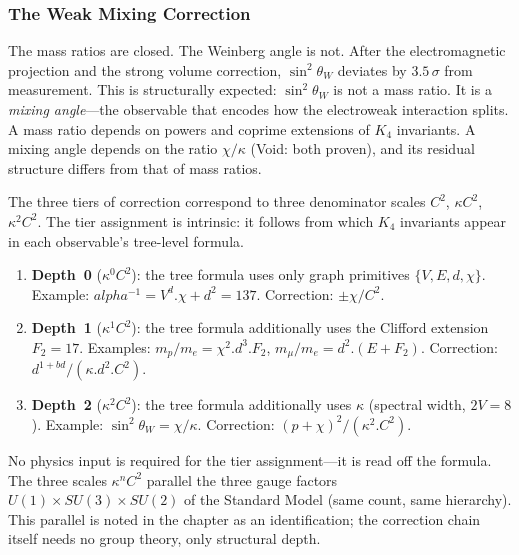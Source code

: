\documentclass[11pt,a4paper]{book}
\def\alpha{alpha}%
\def\cdot{.}%
\def\mathrm#1{#1}%
\begin{document}
\subsubsection*{The Weak Mixing Correction}

The mass ratios are closed.  The Weinberg angle is not.  After the
electromagnetic projection and the strong volume correction,
$\sin^2\!\theta_W$ deviates by $3.5\,\sigma$ from measurement.
This is structurally expected: $\sin^2\!\theta_W$ is not a mass ratio.
It is a \emph{mixing angle}---the observable that encodes how the
electroweak interaction splits.  A mass ratio depends on powers and
coprime extensions of $K_4$ invariants.  A mixing angle depends on
the ratio $\chi/\kappa$ (Void: both proven), and its residual structure
differs from that of mass ratios.

The three tiers of correction correspond to three
denominator scales $C^2$, $\kappa C^2$, $\kappa^2 C^2$.
The tier assignment is intrinsic: it follows from which $K_4$
invariants appear in each observable's tree-level formula.
\begin{enumerate}
\item \textbf{Depth~0} ($\kappa^0 C^2$): the tree formula
      uses only graph primitives $\{V, E, d, \chi\}$.
      Example: $\alpha^{-1} = V^d \cdot \chi + d^2 = 137$.
      Correction: $\pm\chi/C^2$.
\item \textbf{Depth~1} ($\kappa^1 C^2$): the tree formula
      additionally uses the Clifford extension $F_2 = 17$.
      Examples: $m_p/m_e = \chi^2 \cdot d^3 \cdot F_2$,
      $m_\mu/m_e = d^2 \cdot (E + F_2)$.
      Correction: $d^{1+bd}/(\kappa \cdot d^2 \cdot C^2)$.
\item \textbf{Depth~2} ($\kappa^2 C^2$): the tree formula
      additionally uses $\kappa$ (spectral width, $2V = 8$).
      Example: $\sin^2\!\theta_W = \chi/\kappa$.
      Correction: $(p + \chi)^2/(\kappa^2 \cdot C^2)$.
\end{enumerate}
No physics input is required for the tier assignment---it is read
off the formula.  The three scales $\kappa^n C^2$ parallel the
three gauge factors $\mathrm{U}(1) \times \mathrm{SU}(3) \times
\mathrm{SU}(2)$ of the Standard Model (same count, same hierarchy).
This parallel is noted in the chapter \emph{} as an
identification; the correction chain itself needs no group theory,
only structural depth.
\end{document}
